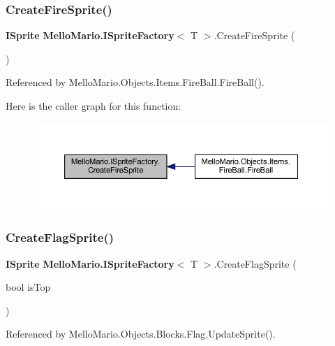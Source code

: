 \subsubsection{Create\+Fire\+Sprite()}
{\footnotesize\ttfamily \textbf{ I\+Sprite} \textbf{ Mello\+Mario.\+I\+Sprite\+Factory}$<$ T $>$.Create\+Fire\+Sprite (\begin{DoxyParamCaption}{ }\end{DoxyParamCaption})}



Referenced by Mello\+Mario.\+Objects.\+Items.\+Fire\+Ball.\+Fire\+Ball().

Here is the caller graph for this function\+:
\nopagebreak
\begin{figure}[H]
\begin{center}
\leavevmode
\includegraphics[width=350pt]{interfaceMelloMario_1_1ISpriteFactory_a0b82b1e3e473fdc84b14657a7396376c_icgraph}
\end{center}
\end{figure}
\mbox{\label{interfaceMelloMario_1_1ISpriteFactory_a65b0d7c27925a037beb2d5f28225d2b7}} 
\subsubsection{Create\+Flag\+Sprite()}
{\footnotesize\ttfamily \textbf{ I\+Sprite} \textbf{ Mello\+Mario.\+I\+Sprite\+Factory}$<$ T $>$.Create\+Flag\+Sprite (\begin{DoxyParamCaption}\item[{bool}]{is\+Top }\end{DoxyParamCaption})}



Referenced by Mello\+Mario.\+Objects.\+Blocks.\+Flag.\+Update\+Sprite().

